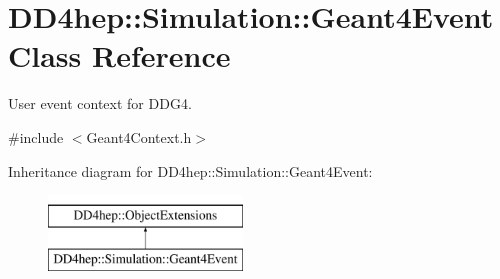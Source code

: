 \hypertarget{class_d_d4hep_1_1_simulation_1_1_geant4_event}{}\section{D\+D4hep\+:\+:Simulation\+:\+:Geant4\+Event Class Reference}
\label{class_d_d4hep_1_1_simulation_1_1_geant4_event}


User event context for D\+D\+G4.  




{\ttfamily \#include $<$Geant4\+Context.\+h$>$}

Inheritance diagram for D\+D4hep\+:\+:Simulation\+:\+:Geant4\+Event\+:\begin{figure}[H]
\begin{center}
\leavevmode
\includegraphics[height=2.000000cm]{class_d_d4hep_1_1_simulation_1_1_geant4_event}
\end{center}
\end{figure}
